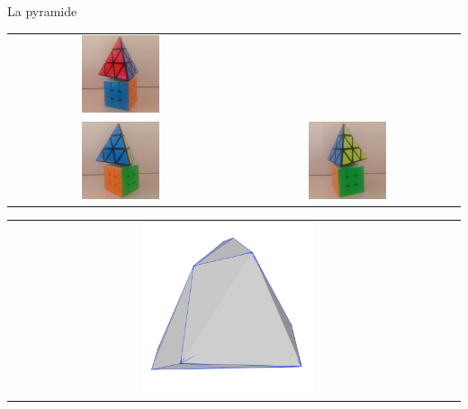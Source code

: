 \begin{frame}{La pyramide}
\begin{minipage}{0.40\textwidth}
\begin{tabular}{cc}
        \includegraphics[width=0.36\textwidth]{capture/pyra5.jpg} \\
        \includegraphics[width=0.36\textwidth]{capture/pyra6.jpg} &
        \includegraphics[width=0.36\textwidth]{capture/pyra7.jpg} \\
    \end{tabular}
\end{minipage}%
\hfill
\begin{minipage}{0.60\textwidth}
    \centering
    \setlength{\tabcolsep}{0pt}
    \renewcommand{\arraystretch}{0}
    \begin{tabular}{cc}
        \includegraphics[width=0.40\textwidth]{capture/face1.png} &

\end{tabular}
\end{minipage}
\end{frame}
